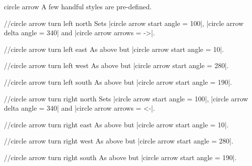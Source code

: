 \begin{ext_shape}{circle arrow}
  A few handful styles are pre-defined.
  \begin{key}{/\pgfext/circle arrow turn left north}
  Sets |circle arrow start angle = 100|, |circle arrow delta angle = 340|
  and |circle arrow arrows = ->|.
  \end{key}
  \begin{key}{/\pgfext/circle arrow turn left east}
  As above but |circle arrow start angle = 10|.
  \end{key}
  \begin{key}{/\pgfext/circle arrow turn left west}
  As above but |circle arrow start angle = 280|.
  \end{key}
  \begin{key}{/\pgfext/circle arrow turn left south}
  As above but |circle arrow start angle = 190|.
  \end{key}
  \begin{key}{/\pgfext/circle arrow turn right north}
  Sets |circle arrow start angle = 100|, |circle arrow delta angle = 340|
  and |circle arrow arrows = <-|.
  \end{key}
  \begin{key}{/\pgfext/circle arrow turn right east}
  As above but |circle arrow start angle = 10|.
  \end{key}
  \begin{key}{/\pgfext/circle arrow turn right west}
  As above but |circle arrow start angle = 280|.
  \end{key}
  \begin{key}{/\pgfext/circle arrow turn right south}
  As above but |circle arrow start angle = 190|.
  \end{key}


\end{ext_shape}
